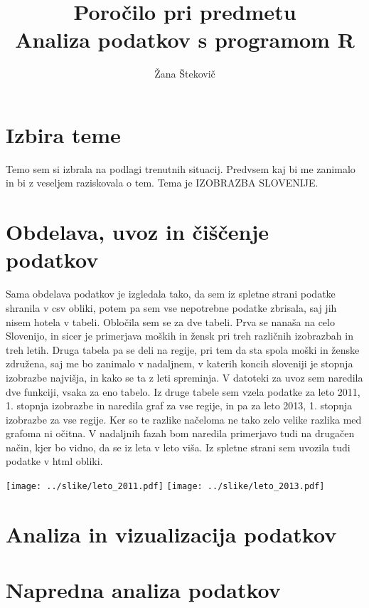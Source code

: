 \documentclass[11pt,a4paper]{article}
\begin{document}
\title{Poročilo pri predmetu \\
Analiza podatkov s programom R}
\author{Žana Štekovič}
\maketitle

\section{Izbira teme}
Temo sem si izbrala na podlagi trenutnih situacij. Predvsem kaj bi me zanimalo in bi z veseljem raziskovala o tem.
Tema je IZOBRAZBA SLOVENIJE.

\section{Obdelava, uvoz in čiščenje podatkov}
Sama obdelava podatkov je izgledala tako, da sem iz spletne strani podatke shranila v csv obliki, potem pa sem vse nepotrebne podatke zbrisala, saj jih nisem hotela v tabeli.
Obločila sem se za dve tabeli. Prva se nanaša na celo Slovenijo, in sicer je primerjava moških in žensk pri treh različnih izobrazbah in treh letih.
Druga tabela pa se deli na regije, pri tem da sta spola moški in ženske združena, saj me bo zanimalo v nadaljnem, v katerih koncih sloveniji je stopnja izobrazbe najvišja, in kako se ta z leti spreminja.
V datoteki za uvoz sem naredila dve funkciji, vsaka za eno tabelo. Iz druge tabele sem vzela podatke za leto 2011, 1. stopnja izobrazbe in naredila graf za vse regije, in pa za leto 2013, 1. stopnja izobrazbe za vse regije. Ker so te razlike načeloma ne tako zelo velike razlika med grafoma ni očitna.
V nadaljnih fazah bom naredila primerjavo tudi na drugačen način, kjer bo vidno, da se iz leta v leto viša.  Iz spletne strani sem uvozila tudi podatke v html obliki.

\texttt{[image: ../slike/leto\_2011.pdf]}
\texttt{[image: ../slike/leto\_2013.pdf]}

\section{Analiza in vizualizacija podatkov}


\section{Napredna analiza podatkov}

\end{document}

